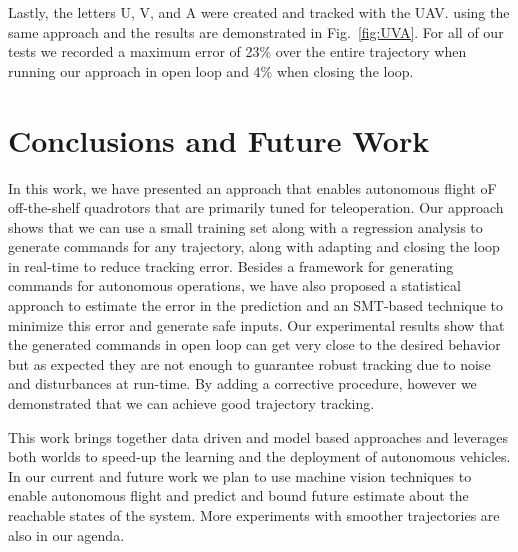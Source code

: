 \documentclass[letterpaper, 10 pt, conference]{ieeeconf}  %
\begin{document}
Lastly, the letters U, V, and A were created and tracked with the UAV. using the same approach and the results are demonstrated in Fig.~\ref{fig:UVA}. For all of our tests we recorded a maximum error of 23$\%$ over the entire trajectory when running our approach in open loop and 4$\%$ when closing the loop. 


\section{Conclusions and Future Work} \label{sec:conc}
In this work, we have presented an approach that enables autonomous flight oF off-the-shelf quadrotors that are primarily tuned for teleoperation. Our approach shows that we can use a small training set along with a regression analysis to generate commands for any trajectory, along with adapting and closing the loop in real-time to reduce tracking error. Besides a framework for generating commands for autonomous operations, we have also proposed a statistical approach to estimate the error in the prediction and an SMT-based technique to minimize this error and generate safe inputs. Our experimental results show that the generated commands in open loop can get very close to the desired behavior but as expected they are not enough to guarantee robust tracking due to noise and disturbances at run-time. By adding a corrective procedure, however we demonstrated that we can achieve good trajectory tracking. 

This work brings together data driven and model based approaches and leverages both worlds to speed-up the learning and the deployment of autonomous vehicles.
In our current and future work we plan to use machine vision techniques to enable autonomous flight and predict and bound future estimate about the reachable states of the system. More experiments with smoother trajectories are also in our agenda.



\end{document}

